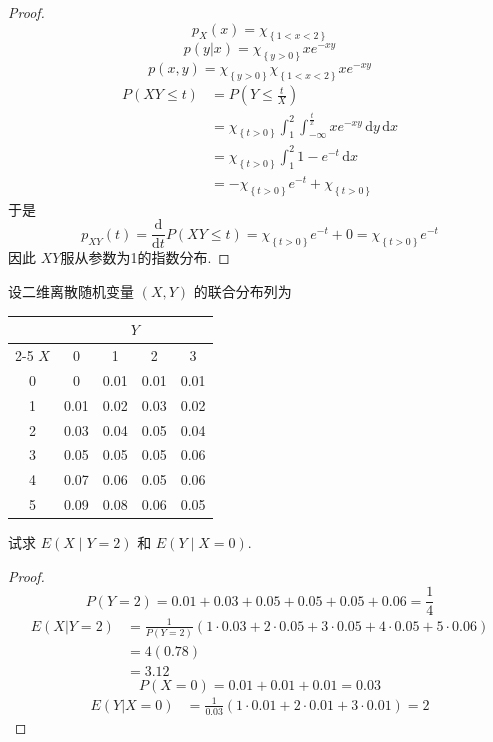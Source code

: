\documentclass[../main.tex]{subfiles}
\begin{document}
\begin{proof}
     \[
     p_{X}\left( x \right)= \chi _{\left\{ 1< x< 2 \right\}} 
     \] \[
     p\left( y|x \right)= \chi _{\left\{ y> 0 \right\}}x e^{-xy} 
     \] \[
     p\left( x,y \right)= \chi _{\left\{ y> 0 \right\}}\chi _{\left\{ 1< x< 2 \right\}}xe^{-xy} 
     \] \[
    \begin{aligned}
     P\left( XY\le t \right)&=  P\left( Y\le \frac{t }{X }  \right) \\ 
      &= \chi _{\left\{ t> 0 \right\}}\int_{1}^{2}\int_{-\infty}^{\frac{t }{x } }xe^{-xy} \,\mathrm{d} y\,\mathrm{d} x\\ 
       &= \chi _{\left\{ t> 0 \right\}} \int_{1}^{2}  1-e^{-t}\,\mathrm{d} x\\ 
        &=- \chi _{\left\{ t> 0 \right\}} e^{-t}+\chi _{\left\{ t> 0 \right\}}
    \end{aligned}
     \]于是 \[
     p_{XY}\left( t \right)= \frac{\mathrm{d}}{\mathrm{d}t}P\left( XY\le t \right)= \chi _{\left\{ t> 0 \right\}}e^{-t}+ 0= \chi _{\left\{ t> 0 \right\}}  e^{-t}
     \]因此 \(  XY  \)服从参数为1的指数分布. 
\end{proof}

\begin{exercise}{}{}
设二维离散随机变量 $(X,Y)$ 的联合分布列为
\begin{center}
\begin{tabular}{c|cccc}
\hline
 & \multicolumn{4}{c}{$Y$} \\
\cline{2-5}
$X$ & 0 & 1 & 2 & 3 \\
\hline
0 & 0 & 0.01 & 0.01 & 0.01 \\
1 & 0.01 & 0.02 & 0.03 & 0.02 \\
2 & 0.03 & 0.04 & 0.05 & 0.04 \\
3 & 0.05 & 0.05 & 0.05 & 0.06 \\
4 & 0.07 & 0.06 & 0.05 & 0.06 \\
5 & 0.09 & 0.08 & 0.06 & 0.05 \\
\hline
\end{tabular}
\end{center}
试求 $E(X \mid Y=2)$ 和 $E(Y \mid X=0)$.
\end{exercise}

\begin{proof}
   \[
   P\left( Y= 2 \right)= 0.01+ 0.03+ 0.05+ 0.05+ 0.05+ 0.06= \frac{1}{4} 
   \] \[
  \begin{aligned}
   E\left( X|Y= 2 \right)&= \frac{1 }{P\left( Y= 2 \right)  }\left( 1\cdot 0.03+ 2\cdot 0.05+ 3\cdot 0.05+ 4\cdot 0.05+ 5\cdot 0.06 \right)    \\ 
    &= 4\left( 0.78 \right)\\ 
     &= 3.12
  \end{aligned}
   \] \[
   P\left( X= 0 \right)= 0.01+ 0.01+ 0.01= 0.03
   \] \[
   \begin{aligned}
   E\left( Y|X= 0 \right)&=\frac{1 }{0.03 } \left( 1\cdot 0.01+ 2\cdot 0.01+ 3\cdot 0.01 \right)  = 2
   \end{aligned}
   \]
\end{proof}
\end{document}
